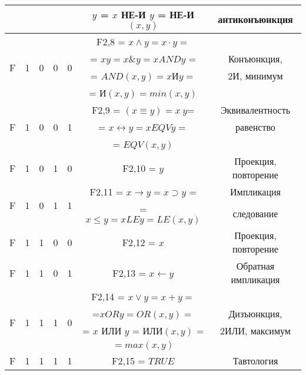 \begin{table}[!h]
\begin{tabular}{|c|c|c|c|c|c|c|}
& & & & & $y$ = $x$ НЕ-И $y$ = НЕ-И$(x,y)$ & антиконъюнкция\\
\hline
& & & & & F2,8 = $x \wedge y = x \cdot y =$ &  \\
\multirow{2}{*}{F} & \multirow{2}{*}{1} & \multirow{2}{*}{0} & \multirow{2}{*}{0} & \multirow{2}{*}{0} &  = $xy = x \& y = x AND y$ = & Конъюнкция,\\
& & & & & = $AND(x,y) = x $И$ y =$ & 2И, минимум \\
& & & & & = И$(x,y) = min(x,y)$	& \\
\hline
& & & & & F2,9 = $(x \equiv y) = x ~ y $= & Эквивалентность \\
F & 1 & 0 & 0 & 1 & = $x \leftrightarrow y = x EQV y = $ & равенство\\
& & & & & = $EQV(x,y)$ & \\
\hline
\multirow{1}{*}{F} & \multirow{1}{*}{1} & \multirow{1}{*}{0} & \multirow{1}{*}{1} & \multirow{1}{*}{0} & F2,10 = $y $  & Проекция, повторение\\
\hline
\multirow{2}{*}{F} & \multirow{2}{*}{1} & \multirow{2}{*}{0} & \multirow{2}{*}{1} & \multirow{2}{*}{1} & F2,11 = $x \to y = x  \supset y$ = & Импликация \\
& & & & &  = $x \le y = x LE y = LE(x,y)$ & следование  \\
\hline
\multirow{1}{*}{F} & \multirow{1}{*}{1} & \multirow{1}{*}{1} & \multirow{1}{*}{0} & \multirow{1}{*}{0} & F2,12 = $x $  & Проекция, повторение\\
\hline
\multirow{1}{*}{F} & \multirow{1}{*}{1} & \multirow{1}{*}{1} & \multirow{1}{*}{0} & \multirow{1}{*}{1} & F2,13 = $x \leftarrow y $  & Обратная импликация\\
\hline
& & & & & F2,14 = $x \vee y = x + y =$ &  \\
\multirow{2}{*}{F} & \multirow{2}{*}{1} & \multirow{2}{*}{1} & \multirow{2}{*}{1} & \multirow{2}{*}{0} & =$ x OR y = OR(x,y) = $ & Дизъюнкция,\\
& & & & & = $x$ ИЛИ $y$ = ИЛИ$(x,y)$ = & 2ИЛИ, максимум \\
& & & & & $ = max(x,y)$	& \\
\hline
\multirow{1}{*}{F} & \multirow{1}{*}{1} & \multirow{1}{*}{1} & \multirow{1}{*}{1} & \multirow{1}{*}{1} & F2,15 = $TRUE $  & Тавтология\\
\hline
\end{tabular}

\end{table}
\newpage
